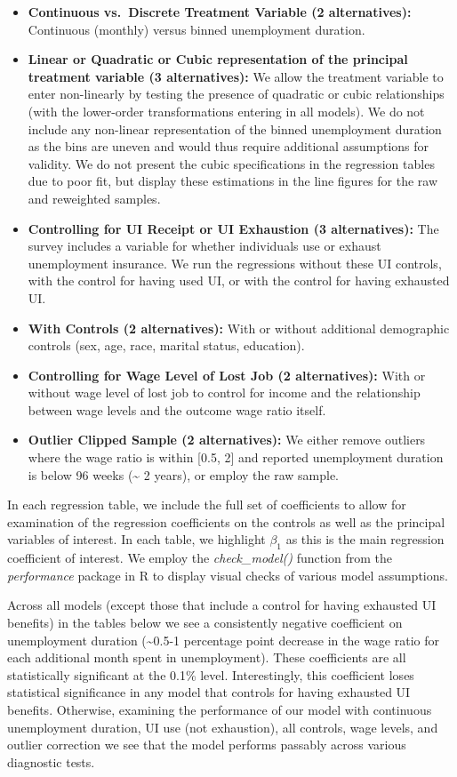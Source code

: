 \documentclass[
]{article}
\begin{document}
\begin{itemize}
\item
  \textbf{Continuous vs.~Discrete Treatment Variable (2 alternatives):}
  Continuous (monthly) versus binned unemployment duration.
\item
  \textbf{Linear or Quadratic or Cubic representation of the principal
  treatment variable (3 alternatives):} We allow the treatment variable
  to enter non-linearly by testing the presence of quadratic or cubic
  relationships (with the lower-order transformations entering in all
  models). We do not include any non-linear representation of the binned
  unemployment duration as the bins are uneven and would thus require
  additional assumptions for validity. We do not present the cubic
  specifications in the regression tables due to poor fit, but display
  these estimations in the line figures for the raw and reweighted
  samples.
\item
  \textbf{Controlling for UI Receipt or UI Exhaustion (3 alternatives):}
  The survey includes a variable for whether individuals use or exhaust
  unemployment insurance. We run the regressions without these UI
  controls, with the control for having used UI, or with the control for
  having exhausted UI.
\item
  \textbf{With Controls (2 alternatives):} With or without additional
  demographic controls (sex, age, race, marital status, education).
\item
  \textbf{Controlling for Wage Level of Lost Job (2 alternatives):} With
  or without wage level of lost job to control for income and the
  relationship between wage levels and the outcome wage ratio itself.
\item
  \textbf{Outlier Clipped Sample (2 alternatives):} We either remove
  outliers where the wage ratio is within {[}0.5, 2{]} and reported
  unemployment duration is below 96 weeks (\textasciitilde{} 2 years),
  or employ the raw sample.
\end{itemize}

In each regression table, we include the full set of coefficients to
allow for examination of the regression coefficients on the controls as
well as the principal variables of interest. In each table, we highlight
\(\beta_{1}\) as this is the main regression coefficient of interest. We
employ the \emph{check\_model()} function from the \emph{performance}
package in R to display visual checks of various model assumptions.

Across all models (except those that include a control for having
exhausted UI benefits) in the tables below we see a consistently
negative coefficient on unemployment duration (\textasciitilde0.5-1
percentage point decrease in the wage ratio for each additional month
spent in unemployment). These coefficients are all statistically
significant at the 0.1\% level. Interestingly, this coefficient loses
statistical significance in any model that controls for having exhausted
UI benefits. Otherwise, examining the performance of our model with
continuous unemployment duration, UI use (not exhaustion), all controls,
wage levels, and outlier correction we see that the model performs
passably across various diagnostic tests.
\end{document}
